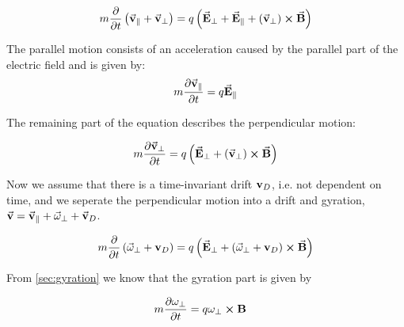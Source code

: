	\begin{equation}
		m\pdv{}{t}\left( \va{v}_\parallel + \va{v}_\perp \right) =
		q \left( \va{E}_\perp + \va{E}_\parallel + \left( \va{v}_\perp\right)  \cross \va{B}\right)
	\end{equation}

	The parallel motion consists of an acceleration caused by the parallel part of the electric field and
	is given by:
	\begin{equation}
		m\pdv{\va{v}_\parallel}{t} = q \va{E}_\parallel
	\end{equation}

	The remaining part of the equation describes the perpendicular motion:

	\begin{equation}
		m\pdv{\va{v}_\perp}{t}  = q \left( \va{E}_\perp +  \left( \va{v}_\perp\right)  \cross \va{B}\right)
	\end{equation}

	Now we assume that there is a time-invariant drift \(\vb{v}_D\), i.e. not dependent on time, and
	we seperate the perpendicular motion into a drift and gyration,
	\(\va{v} = \va{v}_\parallel + \va{\omega}_\perp + \va{v}_D\).

	\begin{equation}
		m\pdv{}{t} \left( \va{\omega}_\perp + \vb{v}_D \right) =
		q \left( \va{E}_\perp +  \left( \va{\omega}_\perp + \vb{v}_D \right)  \cross \va{B}\right)
	\end{equation}



	From \cref{sec:gyration} we know that the gyration part is given by

	\begin{align}
		m\pdv{\vb{\omega}_\perp}{t} &= q\vb{\vb{\omega}_\perp}\cross\vb{B}
	\end{align}

